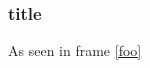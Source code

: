 \documentclass{beamer}
\begin{document}
\begin{frame}[label=foo]
        \frametitle{title}
    \begin{figure}
    \end{figure}
\end{frame} 

\begin{frame}
 As seen in frame \ref{foo}
\end{frame}
\end{document}
